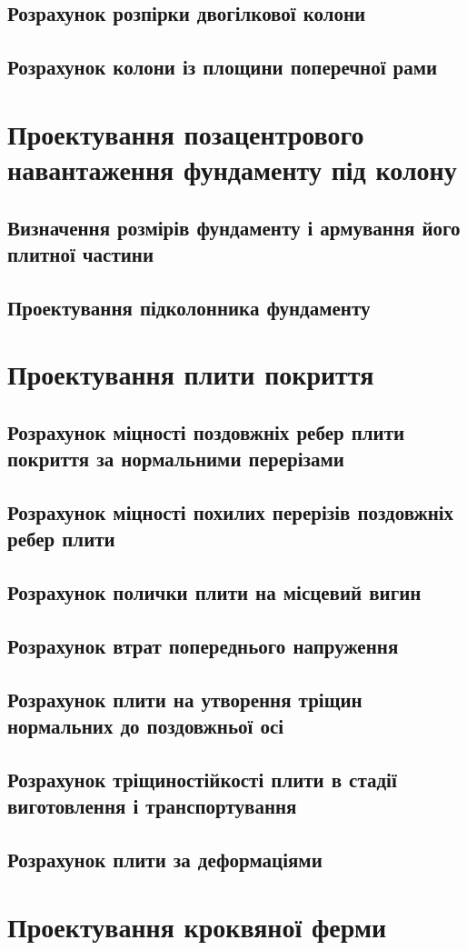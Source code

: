 \documentclass[a4paper,14pt]{article}
\begin{document}
\subsection{Розрахунок розпірки двогілкової колони}

\subsection{Розрахунок колони із площини поперечної рами}
\newpage
\section{Проектування позацентрового навантаження фундаменту під колону}
\subsection{Визначення розмірів фундаменту і армування його плитної частини}
\subsection{Проектування підколонника фундаменту}

\newpage
\section{Проектування плити покриття}
\subsection{Розрахунок міцності поздовжніх ребер плити покриття за нормальними перерізами}
\subsection{Розрахунок міцності похилих перерізів поздовжніх ребер плити}
\subsection{Розрахунок полички плити на місцевий вигин}
\subsection{Розрахунок втрат попереднього напруження}
\subsection{Розрахунок плити на утворення тріщин нормальних до поздовжньої осі}
\subsection{Розрахунок тріщиностійкості плити в стадії виготовлення і транспортування}
\subsection{Розрахунок плити за деформаціями}

\newpage
\section{Проектування кроквяної ферми}
\end{document}
